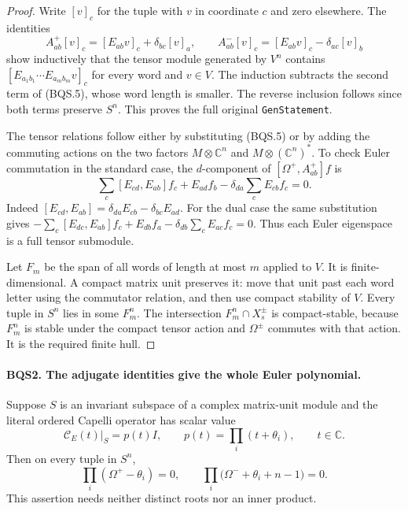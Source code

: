 \begin{proof}
Write $[v]_c$ for the tuple with $v$ in coordinate $c$ and zero elsewhere.
The identities
\[
 A^+_{ab}[v]_c=[E_{ab}v]_c+\delta_{bc}[v]_a,\qquad
 A^-_{ab}[v]_c=[E_{ab}v]_c-\delta_{ac}[v]_b
 \tag{BQS.5}
\]
show inductively that the tensor module generated by $V^n$ contains
$[E_{a_1b_1}\cdots E_{a_mb_m}v]_c$ for every word and $v\in V$.
The induction subtracts the second term of (BQS.5), whose word length
is smaller.  The reverse inclusion follows since both terms preserve
$S^n$.  This proves the full original \texttt{GenStatement}.

The tensor relations follow either by substituting (BQS.5) or by adding
the commuting actions on the two factors $M\otimes\mathbb C^n$ and
$M\otimes(\mathbb C^n)^*$.  To check Euler commutation in the standard
case, the $d$-component of $[\Omega^+,A^+_{ab}]f$ is
\[
 \sum_c[E_{cd},E_{ab}]f_c+E_{ad}f_b
       -\delta_{da}\sum_cE_{cb}f_c=0.
 \tag{BQS.6}
\]
Indeed $[E_{cd},E_{ab}]=\delta_{da}E_{cb}-\delta_{bc}E_{ad}$.
For the dual case the same substitution gives
$-\sum_c[E_{dc},E_{ab}]f_c+E_{db}f_a
-\delta_{db}\sum_cE_{ac}f_c=0$.
Thus each Euler eigenspace is a full tensor submodule.

Let $F_m$ be the span of all words of length at most $m$ applied to $V$.
It is finite-dimensional.  A compact matrix unit preserves it: move that
unit past each word letter using the commutator relation, and then use
compact stability of $V$.  Every tuple in $S^n$ lies in some $F_m^n$.
The intersection $F_m^n\cap X_s^\pm$ is compact-stable, because
$F_m^n$ is stable under the compact tensor action and $\Omega^\pm$
commutes with that action.  It is the required finite hull.
\end{proof}

\paragraph{BQS2. The adjugate identities give the whole Euler polynomial.}
\label{claim:BQS2}
Suppose $S$ is an invariant subspace of a complex matrix-unit module and
the literal ordered Capelli operator has scalar value
\[
 \mathcal C_E(t)|_S=p(t)I,\qquad
 p(t)=\prod_i(t+\theta_i),\qquad t\in\mathbb C.
 \tag{BQS.7}
\]
Then on every tuple in $S^n$,
\[
 \prod_i(\Omega^+-\theta_i)=0,\qquad
 \prod_i\bigl(\Omega^-+\theta_i+n-1\bigr)=0.
 \tag{BQS.8}
\]
This assertion needs neither distinct roots nor an inner product.

